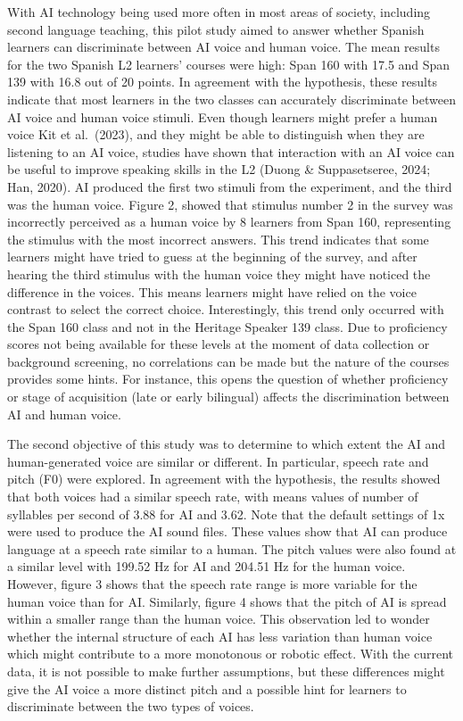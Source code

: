 \documentclass[
  a4paper,
  11pt,
  twocolumn]{article}
\begin{document}
With AI technology being used more often in most areas of society,
including second language teaching, this pilot study aimed to answer
whether Spanish learners can discriminate between AI voice and human
voice. The mean results for the two Spanish L2 learners' courses were
high: Span 160 with 17.5 and Span 139 with 16.8 out of 20 points. In
agreement with the hypothesis, these results indicate that most learners
in the two classes can accurately discriminate between AI voice and
human voice stimuli. Even though learners might prefer a human voice
\cite{kit2023perception} Kit et al.~(2023), and they might be able to
distinguish when they are listening to an AI voice, studies have shown
that interaction with an AI voice can be useful to improve speaking
skills in the L2 \cite{duong2024effects,}(Duong \& Suppasetseree, 2024;
\cite{han2020effects} Han, 2020). AI produced the first two stimuli from
the experiment, and the third was the human voice. Figure 2, showed that
stimulus number 2 in the survey was incorrectly perceived as a human
voice by 8 learners from Span 160, representing the stimulus with the
most incorrect answers. This trend indicates that some learners might
have tried to guess at the beginning of the survey, and after hearing
the third stimulus with the human voice they might have noticed the
difference in the voices. This means learners might have relied on the
voice contrast to select the correct choice. Interestingly, this trend
only occurred with the Span 160 class and not in the Heritage Speaker
139 class. Due to proficiency scores not being available for these
levels at the moment of data collection or background screening, no
correlations can be made but the nature of the courses provides some
hints. For instance, this opens the question of whether proficiency or
stage of acquisition (late or early bilingual) affects the
discrimination between AI and human voice.

The second objective of this study was to determine to which extent the
AI and human-generated voice are similar or different. In particular,
speech rate and pitch (F0) were explored. In agreement with the
hypothesis, the results showed that both voices had a similar speech
rate, with means values of number of syllables per second of 3.88 for AI
and 3.62. Note that the default settings of 1x were used to produce the
AI sound files. These values show that AI can produce language at a
speech rate similar to a human. The pitch values were also found at a
similar level with 199.52 Hz for AI and 204.51 Hz for the human voice.
However, figure 3 shows that the speech rate range is more variable for
the human voice than for AI. Similarly, figure 4 shows that the pitch of
AI is spread within a smaller range than the human voice. This
observation led to wonder whether the internal structure of each AI has
less variation than human voice which might contribute to a more
monotonous or robotic effect. With the current data, it is not possible
to make further assumptions, but these differences might give the AI
voice a more distinct pitch and a possible hint for learners to
discriminate between the two types of voices.
\end{document}
